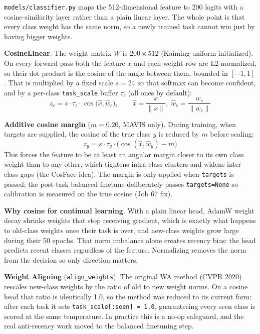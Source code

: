 \documentclass[11pt,a4paper]{article}
\newcommand{\code}[1]{\texttt{#1}}
\begin{document}
\code{models/classifier.py} maps the 512-dimensional feature to 200 logits with a cosine-similarity layer rather than a plain linear layer. The whole point is that every class weight has the same norm, so a newly trained task cannot win just by having bigger weights.

\textbf{CosineLinear}. The weight matrix $W$ is $200 \times 512$ (Kaiming-uniform initialized). On every forward pass both the feature $x$ and each weight row are L2-normalized, so their dot product is the cosine of the angle between them, bounded in $[-1, 1]$. That is multiplied by a fixed scale $s = 24$ so that softmax can become confident, and by a per-class \code{task\_scale} buffer $\tau_c$ (all ones by default):
\begin{equation}
z_c = s \cdot \tau_c \cdot \cos\big(\hat{x}, \hat{w}_c\big), \qquad \hat{x} = \frac{x}{\lVert x \rVert}, \; \hat{w}_c = \frac{w_c}{\lVert w_c \rVert}
\end{equation}

\textbf{Additive cosine margin} ($m = 0.20$, MAVIS only). During training, when targets are supplied, the cosine of the true class $y$ is reduced by $m$ before scaling:
\begin{equation}
z_{y} = s \cdot \tau_y \cdot \big(\cos(\hat{x}, \hat{w}_y) - m\big)
\end{equation}
This forces the feature to be at least an angular margin closer to its own class weight than to any other, which tightens intra-class clusters and widens inter-class gaps (the CosFace idea). The margin is only applied when \code{targets} is passed; the post-task balanced finetune deliberately passes \code{targets=None} so calibration is measured on the true cosine (Job 67 fix).

\textbf{Why cosine for continual learning}. With a plain linear head, AdamW weight decay shrinks weights that stop receiving gradient, which is exactly what happens to old-class weights once their task is over, and new-class weights grow large during their 50 epochs. That norm imbalance alone creates recency bias: the head predicts recent classes regardless of the feature. Normalizing removes the norm from the decision so only direction matters.

\textbf{Weight Aligning} (\code{align\_weights}). The original WA method (CVPR 2020) rescales new-class weights by the ratio of old to new weight norms. On a cosine head that ratio is identically 1.0, so the method was reduced to its current form: after each task it sets \code{task\_scale[:seen] = 1.0}, guaranteeing every seen class is scored at the same temperature. In practice this is a no-op safeguard, and the real anti-recency work moved to the balanced finetuning step.
\end{document}
